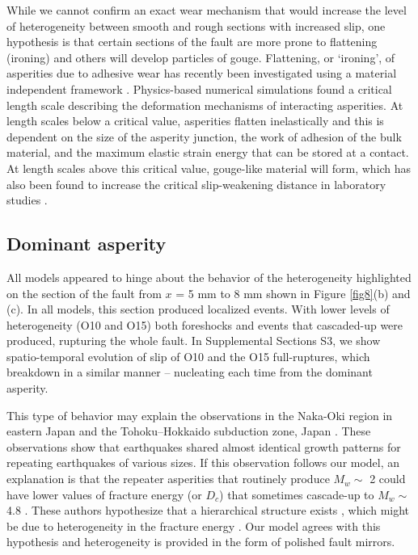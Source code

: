 \documentclass[preprint,1p, 10pt,authoryear]{elsarticle}
\begin{document}
While we cannot confirm an exact wear mechanism that would increase the level of heterogeneity between smooth and rough sections with increased slip, one hypothesis is that certain sections of the fault are more prone to flattening (ironing) and others will develop particles of gouge. Flattening, or ‘ironing’, of asperities due to adhesive wear has recently been investigated using a material independent framework \citep{Aghababaei2016}. Physics-based numerical simulations found a critical length scale describing the deformation mechanisms of interacting asperities. At length scales below a critical value, asperities flatten inelastically and this is dependent on the size of the asperity junction, the work of adhesion of the bulk material, and the maximum elastic strain energy that can be stored at a contact. At length scales above this critical value, gouge-like material will form, which has also been found to increase the critical slip-weakening distance in laboratory studies \citep{Marone1998}.   

\subsection{Dominant asperity}
All models appeared to hinge about the behavior of the heterogeneity highlighted on the section of the fault from $x$ = 5 mm to 8 mm shown in Figure \ref{fig8}(b) and (c). In all models, this section produced localized events. With lower levels of heterogeneity (O10 and O15) both foreshocks and events that cascaded-up were produced, rupturing the whole fault. In Supplemental Sections S3, we show spatio-temporal evolution of slip of O10 and the O15 full-ruptures, which breakdown in a similar manner -- nucleating each time from the dominant asperity.

This type of behavior may explain the observations in the Naka-Oki region in eastern Japan \citep{Okuda2018} and the Tohoku–Hokkaido subduction zone, Japan \citep{Ide2019}. These observations show that earthquakes shared almost identical growth patterns for repeating earthquakes of various sizes. If this observation follows our model, an explanation is that the repeater asperities that routinely produce  $M_{w} \sim$ 2  could have lower values of fracture energy (or $D_{c}$) that sometimes cascade-up to  $M_{w} \sim$ 4.8 \citep{Okuda2018a}.  These authors hypothesize that a hierarchical structure exists \citep[as depicted in fig. 5 of ][]{Okuda2018}, which might be due to heterogeneity in the fracture energy \citep{Ide2005, Aochi2014, Aochi2017}. Our model agrees with this hypothesis and heterogeneity is provided in the form of polished fault mirrors. 
\end{document}
